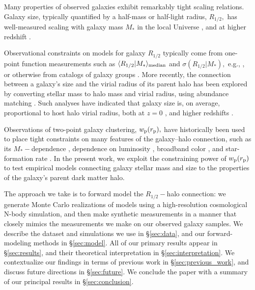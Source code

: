 \documentclass[usenatbib,usegraphicx,letterpaper]{mn2e}
\newcommand{\rhalf}{R_{1/2}}
\newcommand{\mstar}{M_{\ast}}
\newcommand{\rproj}{r_{\rm p}}
\newcommand{\wproj}{w_{\rm p}}
\newcommand{\median}[2]{\langle{#1}\vert{#2}\rangle_{\rm median}}
\begin{document}
Many properties of observed galaxies exhibit remarkably tight scaling relations. Galaxy size, typically quantified by a half-mass or half-light radius, $\rhalf,$ has well-measured scaling with galaxy mass $\mstar$ in the local Universe \citep{shen_etal03,huang_etal13,lange_etal15,zhang_yang17}, and at higher redshift \citep{trujillo_etal04,vanderwel_etal14,kawamata_etal15,shibuya_etal15,huertas_company_etal13a,shibuya_etal15,huang_etal17}.

Observational constraints on models for galaxy $\rhalf$ typically come from one-point function measurements such as $\median{\rhalf}{\mstar}$ and $\sigma(\rhalf\vert\mstar),$ e.g.,  \citet{khochfar_silk06,desmond_etal17,bottrell_etal17b,hou_etal17,somerville_etal17}, or otherwise from catalogs of galaxy groups \citep{weinmann_etal08,guo_etal09,huertas_company_etal13b,spindler_wake17}. More recently, the connection between a galaxy's size and the virial radius of its parent halo has been
explored by converting stellar mass to halo mass and virial radius, using abundance matching \citep{kravtsov_etal04,tasitsiomi_etal04,vale_ostriker04,vale_ostriker06,conroy_etal06}.  Such analyses have indicated that galaxy size is, on average, proportional to host halo virial radius, both at $z=0$ \citep{kravtsov13}, and higher redshifts \citep{huang_etal17,somerville_etal17}.

Observations of two-point galaxy clustering, $\wproj(\rproj),$ have historically been used to place tight constraints on many features of the galaxy--halo connection, such as its $\mstar-$dependence \citep{moster_etal10,leauthaud_etal11,reddick_etal13,skibba_etal15}, dependence on luminosity \citep{kravtsov_etal04, tasitsiomi_etal04,vale_ostriker04,vale_ostriker06,tinker_etal05,cacciato_etal13}, broadband color \citep{coil_etal08,zehavi_etal11,guo_etal11,hearin_watson13}, and star-formation rate \citep{wang_etal07,tinker_etal13,watson_etal14}. In the present work, we exploit the constraining power of $\wproj(\rproj)$ to test empirical models connecting galaxy stellar mass and size to the properties of the galaxy's parent dark matter halo.

The approach we take is to forward model the $\rhalf-$halo connection: we generate Monte Carlo realizations of models using a high-resolution cosmological N-body simulation, and then make synthetic measurements in a manner that closely mimics the measurements we make on our observed galaxy samples. We describe the dataset and simulations we use in \S\ref{sec:data}, and our forward-modeling methods in \S\ref{sec:model}. All of our primary results appear in \S\ref{sec:results}, and their theoretical interpretation in \S\ref{sec:interpretation}. We contextualize our findings in terms of previous work in \S\ref{sec:previous_work}, and discuss future directions in \S\ref{sec:future}. We conclude the paper with a summary of our principal results in \S\ref{sec:conclusion}.
\end{document}
